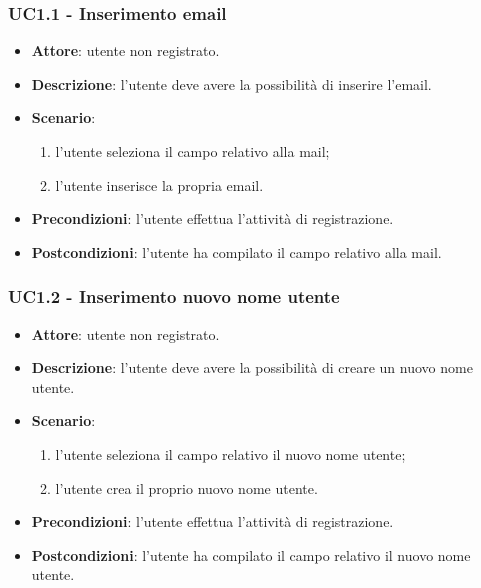 \subsubsection{UC1.1 - Inserimento email}
\begin{itemize}
    \item \textbf{Attore}: utente non registrato.
    \item \textbf{Descrizione}: l'utente deve avere la possibilità di inserire l'email.
    \item \textbf{Scenario}:
    \begin{enumerate}
        \item l'utente seleziona il campo relativo alla mail;
        \item l'utente inserisce la propria email.
    \end{enumerate}

    \item \textbf{Precondizioni}: l'utente effettua l'attività di registrazione.
    \item \textbf{Postcondizioni}: l'utente ha compilato il campo relativo alla mail.
\end{itemize}

\subsubsection{UC1.2 - Inserimento nuovo nome utente}
\begin{itemize}
    \item \textbf{Attore}: utente non registrato.
    \item \textbf{Descrizione}: l'utente deve avere la possibilità di creare un nuovo nome utente.
    \item \textbf{Scenario}:
    \begin{enumerate}
        \item l'utente seleziona il campo relativo il nuovo nome utente;
        \item l'utente crea il proprio nuovo nome utente.
    \end{enumerate}
    \item \textbf{Precondizioni}: l'utente effettua l'attività di registrazione.
    \item \textbf{Postcondizioni}: l'utente ha compilato il campo relativo il nuovo nome utente.
\end{itemize}

